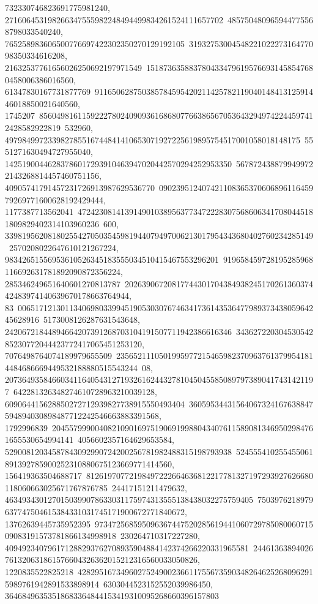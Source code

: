 {{{732330746823691775981240, 271606453198266347555982248494499834261524111657702\
485750480965944775568798033540240, 765258983606500776697422302350270129192105\
3193275300454822102227316477098350334616208, 21632537761656026250692197971549\
1518736358837804334796195766931458547680458006386016560, 61347830167731877769\
91165062875038578459542021142578211904014841312591446018850021640560, 1745207\
85604981611592227802409093616868077663865670536432949742244597412428582922819\
532960, 497984997233982785516744841410653071927225619895754517001058018148175\
5551271630494727955040, 14251900446283786017293910463947020442570294252953350\
5678724388799499722143268814457460751156, 40905741791457231726913987629536770\
09023951240742110836537060689611645979269771600628192429444, 1177387713562041\
47242308141391490103895637734722283075686063417080445181809829402314103960236\
600, 339819562081802554270503545981944079497006213017954343680402760234285149\
2570208022647610121267224, 98342651556953610526345183555034510415467553296201\
919658459728195285968116692631781892090872356224, 285346249651640601270813787\
2026390672081774430170438493824517026136037442483974140639670178663764944, 83\
00651712130113406980339945190530307674634173614353647798937343805964245628916\
5173008126287631543648, 24206721844894664207391268703104191507711942386616346\
34362722030453054285230772044423772417065451253120, 7076498764074189979655509\
23565211105019959772154659823709637613799541814484686669449532188880515543244\
08, 2073649358466034116405431271932616244327810450455850897973890417431421197\
642281326348274610728963210039128, 609064415628850272712939827738915550493404\
36059534431564067324167638847594894030898487712242546663883391568, 1792996839\
20455799900408210901697519069199880434076115890813469502984761655530654994141\
4056602357164629653584, 52900812034587843092990724200256781982488315198793938\
524555410255455061891392785900252310880675123669771414560, 156419363504688717\
81261970772198497222664636812217781327197293927626680118060663025671767876785\
24417151211479632, 4634934301270150399078633031175974313555138438032275759405\
7503976218979637747504615384331031745171900672771840672, 13762639445735952395\
97347256859509636744752028561944106072978508006071509083191573781866134998918\
230264710317227280, 409492340796171288293762708935904884142374266220331965581\
24461363894026761320631861576604326362015212316560033050826, 1220835522825218\
42829516734960275249002366117556735903482646252680962915989761942891533898914\
6303044523152552039986450, 36468496353518683364844153419310095268660396157803\
}}}
